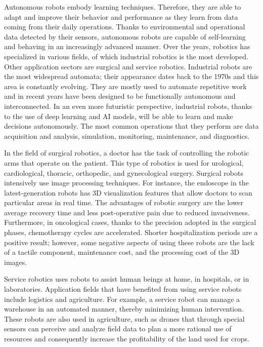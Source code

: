 Autonomous robots embody learning techniques. Therefore, they are able to adapt and improve their behavior and performance as they learn from data coming from their daily operations. Thanks to environmental and operational data detected by their sensors, autonomous robots are capable of self-learning and behaving in an increasingly advanced manner. Over the years, robotics has specialized in various fields, of which industrial robotics is the most developed. Other application sectors are surgical and service robotics. Industrial robots are the most widespread automata; their appearance dates back to the 1970s and this area is constantly evolving. They are mostly used to automate repetitive work and in recent years have been designed to be functionally autonomous and interconnected. In an even more futuristic perspective, industrial robots, thanks to the use of deep learning and AI models, will be able to learn and make decisions autonomously. The most common operations that they perform are data acquisition and analysis, simulation, monitoring, maintenance, and diagnostics.

In the field of surgical robotics, a doctor has the task of controlling the robotic arms that operate on the patient. This type of robotics is used for urological, cardiological, thoracic, orthopedic, and gynecological surgery. Surgical robots intensively use image processing techniques. For instance, the endoscope in the latest-generation robots has 3D visualization features that allow doctors to scan \hbox{particular} areas in real time. The advantages of robotic surgery are the lower average recovery time and less post-operative pain due to reduced invasiveness. Furthermore, in oncological cases, thanks to the precision adopted in the surgical phases, chemotherapy cycles are accelerated. Shorter hospitalization periods are a positive result; however, some negative aspects of using these robots are the lack of a tactile component, maintenance cost, and the processing cost of the 3D images.

Service robotics uses robots to assist human beings at home, in hospitals, or in laboratories. Application fields that have benefited from using service robots include logistics and agriculture. For example, a service robot can manage a warehouse in an automated manner, thereby minimizing human intervention. These robots are also used in agriculture, such as drones that through special sensors can perceive and analyze field data to plan a more rational use of resources and consequently increase the profitability of the land used for crops.

